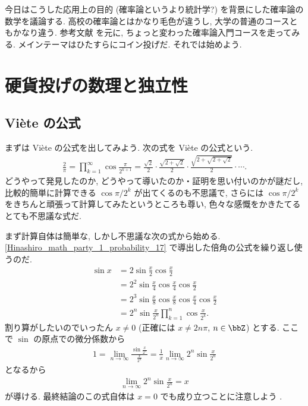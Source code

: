 \documentclass[openany, a4paper, oneside]{jsbook}
\begin{document}
今日はこうした応用上の目的 (確率論というより統計学?) を背景にした確率論の数学を議論する.
高校の確率論とはかなり毛色が違うし, 大学の普通のコースともかなり違う.
参考文献 \cite{MarkKac1} を元に, ちょっと変わった確率論入門コースを走ってみる.
メインテーマはひたすらにコイン投げだ.
それでは始めよう.
\section{硬貨投げの数理と独立性}

\subsection{Vi\`ete の公式 \label{Hinashiro_math_party_1_probability_15}}

まずは Vi\`ete の公式を出してみよう.
次の式を Vi\`ete の公式という.
\begin{align}
 \frac{2}{\pi}
 =
 \prod_{k=1}^{\infty} \cos \frac{\pi}{2^{k+1}}
 =
 \frac{\sqrt{2}}{2} \cdot \frac{\sqrt{2 + \sqrt{2}}}{2} \cdot \frac{\sqrt{2 + \sqrt{2 + \sqrt{2}}}}{2} \cdot \cdots.
\end{align}
どうやって発見したのか, どうやって導いたのか・証明を思い付いのかが謎だし,
比較的簡単に計算できる $\cos \pi/2^k$ が出てくるのも不思議で,
さらには $\cos \pi / 2^k$ をきちんと頑張って計算してみたというところも尊い,
色々な感慨をかきたてるとても不思議な式だ.

まず計算自体は簡単な, しかし不思議な次の式から始める.
\ref{Hinashiro_math_party_1_probability_17} で導出した倍角の公式を繰り返し使うのだ.
\begin{align}
 \sin x
 &=
 2 \sin \frac{x}{2} \cos \frac{x}{2} \\
 &=
 2^2 \sin \frac{x}{4} \cos \frac{x}{4} \cos \frac{x}{2} \\
 &=
 2^3 \sin \frac{x}{8} \cos \frac{x}{8} \cos \frac{x}{4} \cos \frac{x}{2} \\
 &=
 2^n \sin \frac{x}{2^n} \prod_{k=1}^n \cos \frac{x}{2^k}. \label{Hinashiro_math_party_1_probability_1}
\end{align}
割り算がしたいのでいったん $x \neq 0$ (正確には $x \neq 2n \pi$, $n \in \bbZ$) とする.
ここで $\sin$ の原点での微分係数から
\begin{align}
 1
 =
 \lim_{n \to \infty} \frac{\sin \frac{x}{2^n}}{\frac{x}{2^{n}}}
 =
 \frac{1}{x} \lim_{n \to \infty} 2^n \sin \frac{x}{2^n}
\end{align}
となるから
\begin{align}
 \lim_{n \to \infty} 2^n \sin \frac{x}{2^n}
 =
 x \label{Hinashiro_math_party_1_probability_2}
\end{align}
が導ける.
最終結論のこの式自体は $x=0$ でも成り立つことに注意しよう \footnotemark[56]{}.
\end{document}
